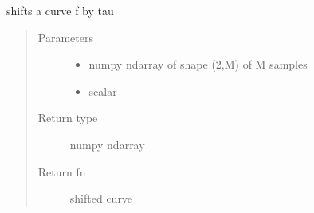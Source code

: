 \documentclass[letterpaper,10pt,english]{sphinxmanual}
\begin{document}

\begin{fulllineitems}
\label{\detokenize{curve_functions:curve_functions.shift_f}}
shifts a curve f by tau
\begin{quote}\begin{description}
\item[{Parameters}] \leavevmode\begin{itemize}
\item {} 
 \textendash{} numpy ndarray of shape (2,M) of M samples

\item {} 
 \textendash{} scalar

\end{itemize}

\item[{Return type}] \leavevmode
numpy ndarray

\item[{Return fn}] \leavevmode
shifted curve

\end{description}\end{quote}

\end{fulllineitems}
\end{document}
